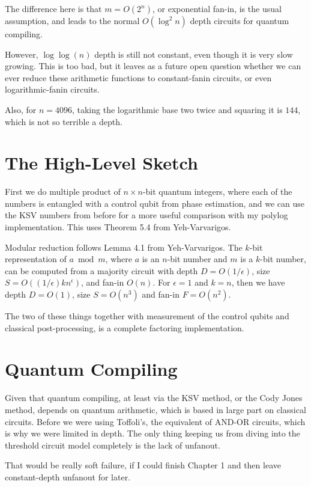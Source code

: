 \documentclass{article}
\begin{document}
The difference here is that $m = O(2^n)$, or exponential fan-in,
is the usual assumption, and leads to the normal $O(\log^2 n)$ depth
circuits for quantum compiling.

However, $\log \log (n)$ depth is still not constant, even though it
is very slow growing. This is too bad, but it leaves as a future open
question whether we can ever reduce these arithmetic functions to
constant-fanin circuits, or even logarithmic-fanin circuits.

Also, for $n = 4096$, taking the logarithmic base two twice and
squaring it is $144$, which is not so terrible a depth.

\section{The High-Level Sketch}

First we do multiple product of $n \times n$-bit quantum integers,
where each of the numbers is entangled with a control qubit from
phase estimation, and we can use the KSV numbers from before for
a more useful comparison with my polylog implementation. This uses
Theorem 5.4 from Yeh-Varvarigos.

Modular reduction follows Lemma 4.1 from Yeh-Varvarigos.
The $k$-bit representation of $a \bmod m$, where $a$ is an $n$-bit number
and $m$ is a $k$-bit number, can be computed from a majority circuit
with depth $D = O(1/\epsilon)$, size $S = O((1/\epsilon)kn^\epsilon)$, and
fan-in $O(n)$. For $\epsilon = 1$ and $k= n$, then we have depth $D=O(1)$,
size $S=O(n^3)$ and fan-in $F=O(n^2)$.

The two of these things together with measurement of the control qubits and
classical post-processing, is a complete factoring implementation.

\section{Quantum Compiling}

Given that quantum compiling, at least via the KSV method, or
the Cody Jones method, depends on quantum arithmetic, which is
based in large part on classical circuits. Before we were using
Toffoli's, the equivalent of AND-OR circuits, which is why we
were limited in depth. The only thing keeping us from diving
into the threshold circuit model completely is the lack of
unfanout.

That would be really soft failure, if I could finish Chapter 1
and then leave constant-depth unfanout for later.
\end{document}
